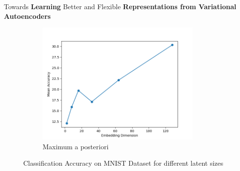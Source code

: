 \documentclass[hyperref={colorlinks,citecolor=blue,linkcolor=blue,urlcolor=blue}]{beamer}
\begin{document}
\begin{frame}{ Towards \textbf{Learning} Better and Flexible \textbf{Representations from Variational Autoencoders} \vspace{0.3em}}
\begin{figure}
\begin{subfigure}[b]{0.4\textwidth}
        \includegraphics[width=0.9\textwidth]{./Images/MNIST_VAE_MAP.png}
        \caption{Maximum a posteriori}
    \end{subfigure}
    \caption{Classification Accuracy on MNIST Dataset for different latent sizes}
  \end{figure}
\end{frame}
\end{document}
